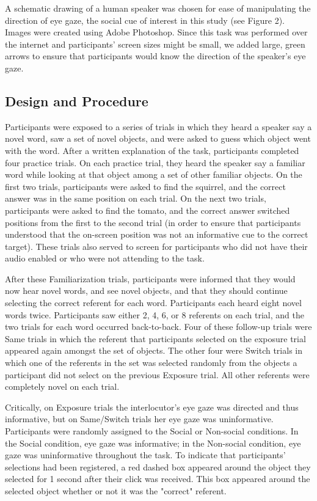 \documentclass[man]{apa2}
\begin{document}
A schematic drawing of a human speaker was chosen for ease of manipulating the direction of eye gaze, the social cue of interest in this study (see Figure 2). Images were created using Adobe Photoshop. Since this task was performed over the internet and participants' screen sizes might be small, we added large, green arrows to ensure that participants would know the direction of the speaker's eye gaze.


\subsection{Design and Procedure}
Participants were exposed to a series of trials in which they heard a speaker say a novel word, saw a set of novel objects, and were asked to guess which object went with the word. After a written explanation of the task, participants completed
four practice trials. On each practice trial, they heard the speaker say a
familiar word while looking at that object among a set of other familiar objects.
On the first two trials, participants were asked to find the squirrel, and the correct answer
was in the same position on each trial. On the next two trials, participants were asked to
find the tomato, and the correct answer switched positions from the first to the second
trial (in order to ensure that participants understood that the on-screen position was not
an informative cue to the correct target). These trials also served to screen for participants
who did not have their audio enabled or who were not attending to the task.

After these Familiarization trials, participants were informed that they would now hear
novel words, and see novel objects, and that they should continue selecting the correct
referent for each word. Participants each heard eight novel words twice. Participants saw either 2, 4, 6, or 8 referents on each trial, and the two trials for each word occurred back-to-back. Four of these follow-up trials were Same trials in which the referent that participants selected on the exposure trial appeared again amongst the set of objects. The other four were
Switch trials in which one of the referents in the set was selected randomly from the objects
a participant did not select on the previous Exposure trial. All other referents were
completely novel on each trial. 

Critically, on Exposure trials the interlocutor's eye gaze was directed and thus informative, but on Same/Switch trials her eye gaze was uninformative. Participants were randomly assigned to the Social or Non-social conditions. In the Social condition, eye gaze was informative; in the Non-social condition, eye gaze was uninformative throughout the task. To indicate that participants' selections had been registered, a red dashed box appeared
around the object they selected for 1 second after their click was received. This box
appeared around the selected object whether or not it was the "correct" referent.
\end{document}
